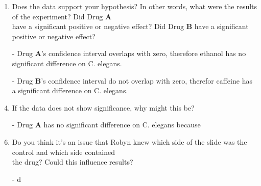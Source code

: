 \documentclass{article}
\def\DA#1{\textcolor{B}{\textbf{#1}}}
\def\DB#1{\textcolor{G}{\textbf{#1}}}
\begin{document}
\begin{center}
{\begin{minipage}{53em}
\begin{enumerate}
      \item Does the data support your hypothesis? In other words, what were the results of the experiment? Did Drug \DA{A}\\have a significant positive or negative effect? Did Drug \DB{B} have a significant positive or negative effect?
      \item[-] Drug \DA{A}'s confidence interval overlaps with zero, therefore ethanol has no significant difference on C. elegans.
      \item[-] Drug \DB{B}'s confidence interval do not overlap with zero, therefor caffeine has a significant difference on C. elegans.
      \item If the data does not show significance, why might this be?
      \item[-] Drug \DA{A} has no significant difference on C. elegans because
      \item Do you think it's an issue that Robyn knew which side of the slide was the control and which side contained\\the drug? Could this influence results?
      \item[-] d
    \end{enumerate}
  \end{minipage}}
\end{center}
\end{document}
